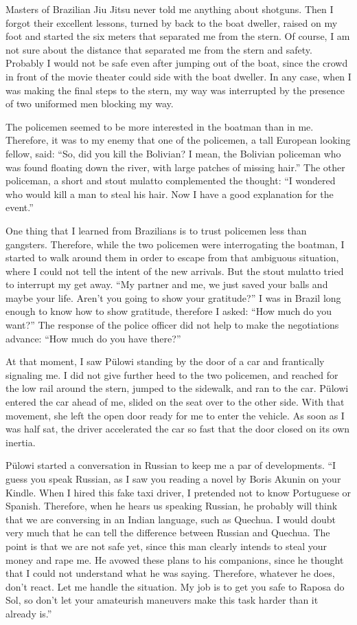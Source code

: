 \documentclass[
  12pt,
]{book}
\begin{document}
Masters of Brazilian Jiu Jitsu never told me anything about shotguns.
Then I forgot their excellent lessons, turned by back to the boat
dweller, raised on my foot and started the six meters that separated me
from the stern. Of course, I am not sure about the distance that
separated me from the stern and safety. Probably I would not be safe
even after jumping out of the boat, since the crowd in front of the
movie theater could side with the boat dweller. In any case, when I was
making the final steps to the stern, my way was interrupted by the
presence of two uniformed men blocking my way.

The policemen seemed to be more interested in the boatman than in me.
Therefore, it was to my enemy that one of the policemen, a tall European
looking fellow, said: ``So, did you kill the Bolivian? I mean, the
Bolivian policeman who was found floating down the river, with large
patches of missing hair.'' The other policeman, a short and stout
mulatto complemented the thought: ``I wondered who would kill a man to
steal his hair. Now I have a good explanation for the event.''

One thing that I learned from Brazilians is to trust policemen less than
gangsters. Therefore, while the two policemen were interrogating the
boatman, I started to walk around them in order to escape from that
ambiguous situation, where I could not tell the intent of the new
arrivals. But the stout mulatto tried to interrupt my get away. ``My
partner and me, we just saved your balls and maybe your life. Aren't you
going to show your gratitude?'' I was in Brazil long enough to know how
to show gratitude, therefore I asked: ``How much do you want?'' The
response of the police officer did not help to make the negotiations
advance: ``How much do you have there?''

At that moment, I saw Pülowi standing by the door of a car and
frantically signaling me. I did not give further heed to the two
policemen, and reached for the low rail around the stern, jumped to the
sidewalk, and ran to the car. Pülowi entered the car ahead of me, slided
on the seat over to the other side. With that movement, she left the
open door ready for me to enter the vehicle. As soon as I was half sat,
the driver accelerated the car so fast that the door closed on its own
inertia.

Pülowi started a conversation in Russian to keep me a par of
developments. ``I guess you speak Russian, as I saw you reading a novel
by Boris Akunin on your Kindle. When I hired this fake taxi driver, I
pretended not to know Portuguese or Spanish. Therefore, when he hears us
speaking Russian, he probably will think that we are conversing in an
Indian language, such as Quechua. I would doubt very much that he can
tell the difference between Russian and Quechua. The point is that we
are not safe yet, since this man clearly intends to steal your money and
rape me. He avowed these plans to his companions, since he thought that
I could not understand what he was saying. Therefore, whatever he does,
don't react. Let me handle the situation. My job is to get you safe to
Raposa do Sol, so don't let your amateurish maneuvers make this task
harder than it already is.''
\end{document}
